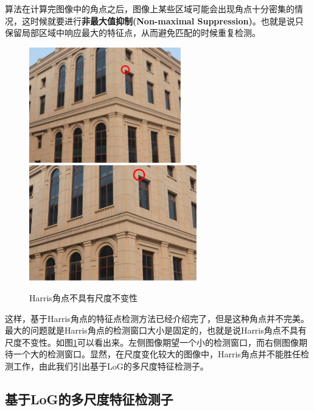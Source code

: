 算法在计算完图像中的角点之后，图像上某些区域可能会出现角点十分密集的情况，这时候就要进行\textbf{非最大值抑制(Non-maximal Suppression)}。也就是说只保留局部区域中响应最大的特征点，从而避免匹配的时候重复检测。\par
\begin{figure}[htbp]
	\includegraphics[height=5cm]{figures/LoG1.png}
	\includegraphics[height=5cm]{figures/LoG2.png}
	\caption{Harris角点不具有尺度不变性}
	\label{HarrisScale}
\end{figure}
这样，基于Harris角点的特征点检测方法已经介绍完了，但是这种角点并不完美。最大的问题就是Harris角点的检测窗口大小是固定的，也就是说Harris角点不具有尺度不变性。如图\ref{HarrisScale}可以看出来。左侧图像期望一个小的检测窗口，而右侧图像期待一个大的检测窗口。显然，在尺度变化较大的图像中，Harris角点并不能胜任检测工作，由此我们引出基于LoG的多尺度特征检测子。\par

\subsection{基于LoG的多尺度特征检测子}
